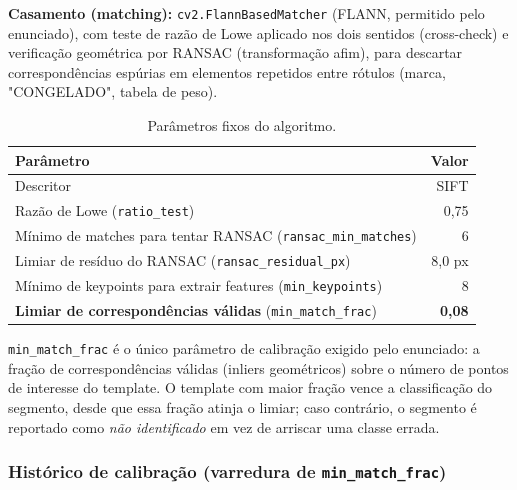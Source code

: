 \documentclass[a4paper,11pt]{article}
\begin{document}
\textbf{Casamento (matching):} \texttt{cv2.FlannBasedMatcher} (FLANN, permitido pelo enunciado),
com teste de razão de Lowe aplicado nos dois sentidos (cross-check) e verificação geométrica por
RANSAC (transformação afim), para descartar correspondências espúrias em elementos repetidos entre
rótulos (marca, "CONGELADO", tabela de peso).

\begin{table}[H]
\centering
\small
\begin{tabular}{@{}p{11.5cm} r@{}}
\toprule
\textbf{Parâmetro} & \textbf{Valor} \\
\midrule
Descritor                                    & SIFT \\
Razão de Lowe (\texttt{ratio\_test})         & 0,75 \\
Mínimo de matches para tentar RANSAC (\texttt{ransac\_min\_matches}) & 6 \\
Limiar de resíduo do RANSAC (\texttt{ransac\_residual\_px})         & 8,0 px \\
Mínimo de keypoints para extrair features (\texttt{min\_keypoints}) & 8 \\
\textbf{Limiar de correspondências válidas} (\texttt{min\_match\_frac}) & \textbf{0,08} \\
\bottomrule
\end{tabular}
\caption{Parâmetros fixos do algoritmo.}
\end{table}

\texttt{min\_match\_frac} é o único parâmetro de calibração exigido pelo enunciado: a fração de
correspondências válidas (inliers geométricos) sobre o número de pontos de interesse do template.
O template com maior fração vence a classificação do segmento, desde que essa fração atinja o
limiar; caso contrário, o segmento é reportado como \emph{não identificado} em vez de arriscar uma
classe errada.

\subsubsection{Histórico de calibração (varredura de \texttt{min\_match\_frac})}
\end{document}
